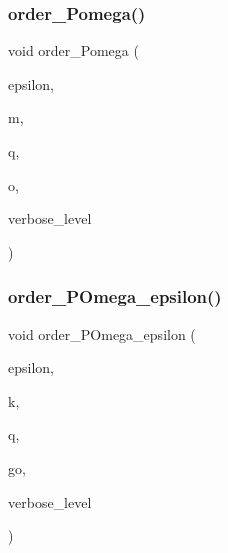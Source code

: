 \mbox{\label{_l_i_b_2_g_a_l_o_i_s_2orthogonal__points_8_c_a8a75012f4c2c42c0d27dae7d7164de00}} 
\subsubsection{\texorpdfstring{order\+\_\+\+Pomega()}{order\_Pomega()}}
{\footnotesize\ttfamily void order\+\_\+\+Pomega (\begin{DoxyParamCaption}\item[{\mbox{\hyperlink{galois_8h_a09fddde158a3a20bd2dcadb609de11dc}{I\+NT}}}]{epsilon,  }\item[{\mbox{\hyperlink{galois_8h_a09fddde158a3a20bd2dcadb609de11dc}{I\+NT}}}]{m,  }\item[{\mbox{\hyperlink{galois_8h_a09fddde158a3a20bd2dcadb609de11dc}{I\+NT}}}]{q,  }\item[{\mbox{\hyperlink{classlonginteger__object}{longinteger\+\_\+object}} \&}]{o,  }\item[{\mbox{\hyperlink{galois_8h_a09fddde158a3a20bd2dcadb609de11dc}{I\+NT}}}]{verbose\+\_\+level }\end{DoxyParamCaption})}

\mbox{\label{_l_i_b_2_g_a_l_o_i_s_2orthogonal__points_8_c_a8ecfc1dff843761ef0e45b03572c09d0}} 
\subsubsection{\texorpdfstring{order\+\_\+\+P\+Omega\+\_\+epsilon()}{order\_POmega\_epsilon()}}
{\footnotesize\ttfamily void order\+\_\+\+P\+Omega\+\_\+epsilon (\begin{DoxyParamCaption}\item[{\mbox{\hyperlink{galois_8h_a09fddde158a3a20bd2dcadb609de11dc}{I\+NT}}}]{epsilon,  }\item[{\mbox{\hyperlink{galois_8h_a09fddde158a3a20bd2dcadb609de11dc}{I\+NT}}}]{k,  }\item[{\mbox{\hyperlink{galois_8h_a09fddde158a3a20bd2dcadb609de11dc}{I\+NT}}}]{q,  }\item[{\mbox{\hyperlink{classlonginteger__object}{longinteger\+\_\+object}} \&}]{go,  }\item[{\mbox{\hyperlink{galois_8h_a09fddde158a3a20bd2dcadb609de11dc}{I\+NT}}}]{verbose\+\_\+level }\end{DoxyParamCaption})}

